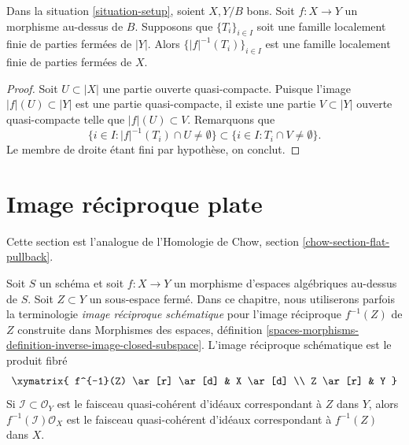 \begin{lemma}
\label{lemma-inverse-image-locally-finite}
Dans la situation \ref{situation-setup}, soient $X, Y/B$ bons. Soit $f :
X \to Y$ un morphisme au-dessus de $B$. Supposons que $\{T_i\}_{i \in I}$ soit
une famille localement finie de parties fermées de $|Y|$. Alors
$\{|f|^{-1}(T_i)\}_{i \in I}$ est une famille localement finie de
parties fermées de $X$.
\end{lemma}

\begin{proof}
Soit $U \subset |X|$ une partie ouverte quasi-compacte. Puisque l'image
$|f|(U) \subset |Y|$ est une partie quasi-compacte, il existe une partie $V
\subset |Y|$ ouverte quasi-compacte telle que $|f|(U) \subset V$. Remarquons que
$$
\{i \in I : |f|^{-1}(T_i) \cap U \not = \emptyset \}
\subset
\{i \in I : T_i \cap V \not = \emptyset \}.
$$
Le membre de droite étant fini par hypothèse, on conclut.
\end{proof}

















\section{Image réciproque plate}
\label{section-flat-pullback}

\noindent
Cette section est l'analogue de l'Homologie de Chow, section
\ref{chow-section-flat-pullback}.

\medskip\noindent
Soit $S$ un schéma et soit $f : X \to Y$ un morphisme d'espaces algébriques
au-dessus de $S$. Soit $Z \subset Y$ un sous-espace fermé. Dans ce chapitre, nous
utiliserons parfois la terminologie {\it image réciproque schématique}
pour l'image réciproque $f^{-1}(Z)$ de $Z$ construite dans Morphismes des
espaces, définition
\ref{spaces-morphisms-definition-inverse-image-closed-subspace}. L'image
réciproque schématique est le produit fibré
$$
\xymatrix{
f^{-1}(Z) \ar[r] \ar[d] & X \ar[d] \\
Z \ar[r] & Y
}
$$
Si $\mathcal{I} \subset \mathcal{O}_Y$ est le faisceau quasi-cohérent d'idéaux
correspondant à $Z$ dans $Y$, alors $f^{-1}(\mathcal{I})\mathcal{O}_X$ est le
faisceau quasi-cohérent d'idéaux correspondant à $f^{-1}(Z)$ dans $X$.

